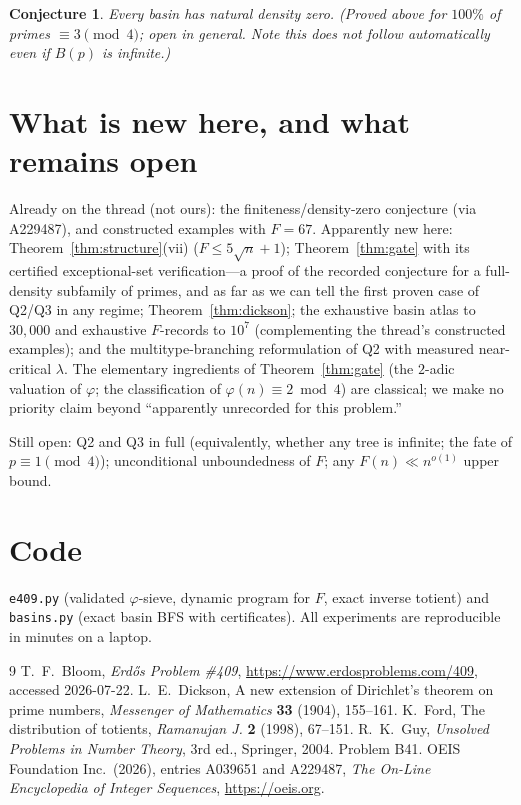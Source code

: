 \documentclass[11pt,a4paper]{article}
\newtheorem{conjecture}{Conjecture}
\theoremstyle{remark}
\begin{document}
\begin{conjecture}\label{conj:density}
Every basin has natural density zero. (Proved above for $100\%$ of primes $\equiv 3\pmod 4$; open in general. Note this does not follow automatically even if $B(p)$ is infinite.)
\end{conjecture}

\section{What is new here, and what remains open}

Already on the thread (not ours): the finiteness/density-zero conjecture (via A229487), and constructed examples with $F=67$. Apparently new here: Theorem~\ref{thm:structure}(vii) ($F\le 5\sqrt n+1$); Theorem~\ref{thm:gate} with its certified exceptional-set verification---a proof of the recorded conjecture for a full-density subfamily of primes, and as far as we can tell the first proven case of Q2/Q3 in any regime; Theorem~\ref{thm:dickson}; the exhaustive basin atlas to $30{,}000$ and exhaustive $F$-records to $10^7$ (complementing the thread's constructed examples); and the multitype-branching reformulation of Q2 with measured near-critical $\lambda$. The elementary ingredients of Theorem~\ref{thm:gate} (the $2$-adic valuation of $\varphi$; the classification of $\varphi(n)\equiv 2\bmod 4$) are classical; we make no priority claim beyond ``apparently unrecorded for this problem.''

Still open: Q2 and Q3 in full (equivalently, whether any tree is infinite; the fate of $p\equiv 1\pmod 4$); unconditional unboundedness of $F$; any $F(n)\ll n^{o(1)}$ upper bound.

\section{Code}

\texttt{e409.py} (validated $\varphi$-sieve, dynamic program for $F$, exact inverse totient) and \texttt{basins.py} (exact basin BFS with certificates). All experiments are reproducible in minutes on a laptop.

\begin{thebibliography}{9}
 T.~F.~Bloom, \emph{Erd\H{o}s Problem \#409}, \url{https://www.erdosproblems.com/409}, accessed 2026-07-22.
 L.~E.~Dickson, A new extension of Dirichlet's theorem on prime numbers, \emph{Messenger of Mathematics} \textbf{33} (1904), 155--161.
 K.~Ford, The distribution of totients, \emph{Ramanujan J.} \textbf{2} (1998), 67--151.
 R.~K.~Guy, \emph{Unsolved Problems in Number Theory}, 3rd ed., Springer, 2004. Problem B41.
 OEIS Foundation Inc.\ (2026), entries A039651 and A229487, \emph{The On-Line Encyclopedia of Integer Sequences}, \url{https://oeis.org}.
\end{thebibliography}
\end{document}
